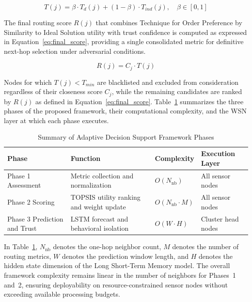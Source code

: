 \documentclass[a4paper,fleqn]{cas-dc}
\numberwithin{equation}{section}
\begin{document}
\begin{equation}
\label{eq:trust_composite}
T(j) = \beta \cdot T_d(j) + (1 - \beta) \cdot T_{ind}(j),
\quad \beta \in [0,1]
\end{equation}

The final routing score $R(j)$ that combines Technique for Order
Preference by Similarity to Ideal Solution utility with trust
confidence is computed as expressed in
Equation~\ref{eq:final_score}, providing a single consolidated
metric for definitive next-hop selection under adversarial conditions.

\begin{equation}
\label{eq:final_score}
R(j) = C_j \cdot T(j)
\end{equation}

Nodes for which $T(j) < T_{min}$ are blacklisted and excluded from
consideration regardless of their closeness score $C_j$, while the
remaining candidates are ranked by $R(j)$ as defined in
Equation~\ref{eq:final_score}. Table~\ref{tab:phase_summary}
summarizes the three phases of the proposed framework, their
computational complexity, and the WSN layer at which each phase
executes.

\begin{table}[htbp]
\centering
\caption{Summary of Adaptive Decision Support Framework Phases}
\label{tab:phase_summary}
\begin{tabular}{p{3.0cm} p{4.4cm} p{2.8cm} p{3.0cm}}
\toprule
\textbf{Phase} & \textbf{Function} &
\textbf{Complexity} & \textbf{Execution Layer} \\
\midrule
Phase 1 Assessment
  & Metric collection and normalization
  & $O(N_{\text{nb}})$
  & All sensor nodes \\
Phase 2 Scoring
  & TOPSIS utility ranking and weight update
  & $O(N_{\text{nb}} \cdot M)$
  & All sensor nodes \\
Phase 3 Prediction and Trust
  & LSTM forecast and behavioral isolation
  & $O(W \cdot H)$
  & Cluster head nodes \\
\bottomrule
\end{tabular}
\end{table}

In Table~\ref{tab:phase_summary}, $N_{\text{nb}}$ denotes the one-hop
neighbor count, $M$ denotes the number of routing metrics, $W$ denotes
the prediction window length, and $H$ denotes the hidden state
dimension of the Long Short-Term Memory model. The overall framework
complexity remains linear in the number of neighbors for Phases~1
and~2, ensuring deployability on resource-constrained sensor nodes
without exceeding available processing
budgets.\cite{R3_Narkedimilli2025AdaptiveCurriculumIoT,Madhavan2025DesigningSecureIoT}
\end{document}

